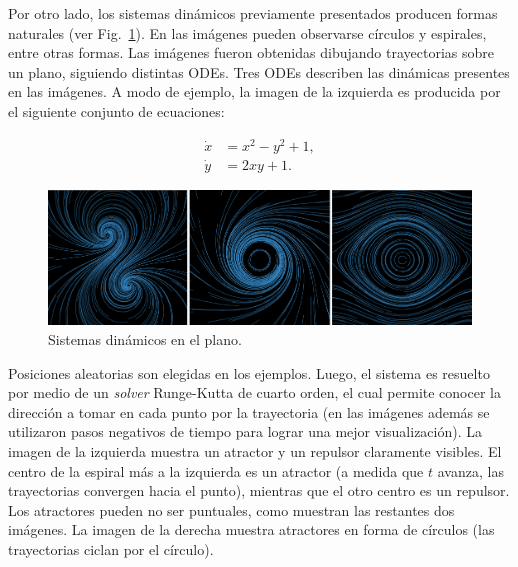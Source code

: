 \documentclass[oneside,a4paper,spanish,links]{amca}
\begin{document}
Por otro lado, los sistemas din\'amicos previamente presentados producen formas naturales (ver Fig.~\ref{fg:fig3}). En las im\'agenes pueden observarse c\'irculos y espirales, entre otras formas. Las im\'agenes fueron obtenidas dibujando trayectorias sobre un plano, siguiendo distintas ODEs. Tres ODEs describen las din\'amicas presentes en las im\'agenes. A modo de ejemplo, la imagen de la izquierda es producida por el siguiente conjunto de ecuaciones:

\begin{equation} \label{eq:simple}  
  \begin{aligned}
    \dot{x} &= x^{2}-y^{2}+1,\\
    \dot{y} &= 2xy+1.
  \end{aligned}
\end{equation}


\begin{figure}[htb!]
  \centerline{\includegraphics[scale=0.28]{fig3}}
  \caption{Sistemas din\'amicos en el plano.}
  \label{fg:fig3}
\end{figure}

Posiciones aleatorias son elegidas en los ejemplos. Luego, el sistema es resuelto por medio de un {\em solver} Runge-Kutta de cuarto orden, el cual permite conocer la direcci\'on a tomar en cada punto por la trayectoria (en las im\'agenes adem\'as se utilizaron pasos negativos de tiempo para lograr una mejor visualizaci\'on). La imagen de la izquierda muestra un atractor y un repulsor claramente visibles. El centro de la espiral m\'as a la izquierda es un atractor (a medida que $t$ avanza, las trayectorias convergen hacia el punto), mientras que el otro centro es un repulsor. Los atractores pueden no ser puntuales, como muestran las restantes dos im\'agenes. La imagen de la derecha muestra atractores en forma de c\'irculos (las trayectorias ciclan por el c\'irculo).
\end{document}
